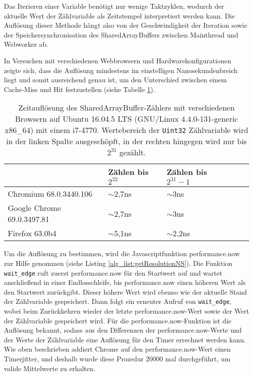 Das Iterieren einer Variable benötigt nur wenige Taktzyklen, wodurch der aktuelle Wert der Zählvariable als Zeitstempel interpretiert werden kann. 
Die Auflösung dieser Methode hängt also von der Geschwindigkeit der Iteration sowie der Speichersynchronisation des SharedArrayBuffers zwischen Mainthread und Webworker ab.

In Versuchen mit verschiedenen Webbrowsern und Hardwarekonfigurationen zeigte sich, dass die Auflösung mindestens im einstelligen Nanosekundenbreich liegt und somit ausreichend genau ist, um den Unterschied zwischen einem Cache-Miss und Hit festzustellen (siehe Tabelle \ref{tbl:times_res}).

\begin{table}[h]
\caption{Zeitauflösung des SharedArrayBuffer-Zählers mit verschiedenen Browsern auf Ubuntu 16.04.5 LTS (GNU/Linux 4.4.0-131-generic x86_64) mit einem i7-4770. Wertebereich der \lstinline{Uint32} Zählvariable wird in der linken Spalte ausgeschöpft, in der rechten hingegen wird nur bis $2^{31}$ gezählt.}
\label{tbl:times_res}
\begin{tabular}{lllll}
\toprule
                           & Zählen bis $2^{32}$ & Zählen bis $2^{31}-1$ &  &  \\
                           \midrule
Chromium 68.0.3440.106     & $\sim$2,7ns                      & $\sim$3ns                        &  &  \\
Google Chrome 69.0.3497.81 & $\sim$2,7ns                      & $\sim$3ns                        &  &  \\
Firefox 63.0b4             & $\sim$5,1ns                      & $\sim$2,2ns                      &  &  \\
\bottomrule
\end{tabular}
\end{table}

Um die Auflösung zu bestimmen, wird die Javascriptfunktion performance.now zur Hilfe genommen (siehe Listing \ref{alg_list:getResolutionNS}). Die Funktion \lstinline{wait_edge} ruft zuerst performance.now für den Startwert auf und wartet anschließend in einer Endlosschleife, bis performance.now einen höheren Wert als den Startwert zurückgibt. 
Dieser höhere Wert wird ebenso wie der aktuelle Stand der Zählvariable gespeichert. 
Dann folgt ein erneuter Aufruf von \lstinline{wait_edge}, wobei beim Zurückkehren wieder der letzte performance.now-Wert sowie der Wert der Zählvariable gespeichert wird.
Für die performance.now-Funktion ist die Auflösung bekannt, sodass aus den Differenzen der performance.now-Werte und der Werte der Zählvariable eine Auflösung für den Timer errechnet werden kann.
Wie oben beschrieben addiert Chrome auf den performance.now-Wert einen Timerjitter, und deshalb wurde diese Prozedur 20000 mal durchgeführt, um valide Mittelwerte zu erhalten.

